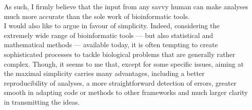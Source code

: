 As such, I firmly believe that the input from any savvy human can make analyses much more accurate than the sole work of bioinformatic tools.\\

I would also like to argue in favour of simplicity.
Indeed, considering the extremely wide range of bioinformatic tools — but also statistical and mathematical methods — available today, it is often tempting to create sophisticated processes to tackle biological problems that are generally rather complex.
Though, it seems to me that, except for some specific issues, aiming at the maximal simplicity carries many advantages, including a better reproducibility of analyses, a more straightforward detection of errors, greater smooth in adapting code or methods to other frameworks and much larger clarity in transmitting the ideas.


%








